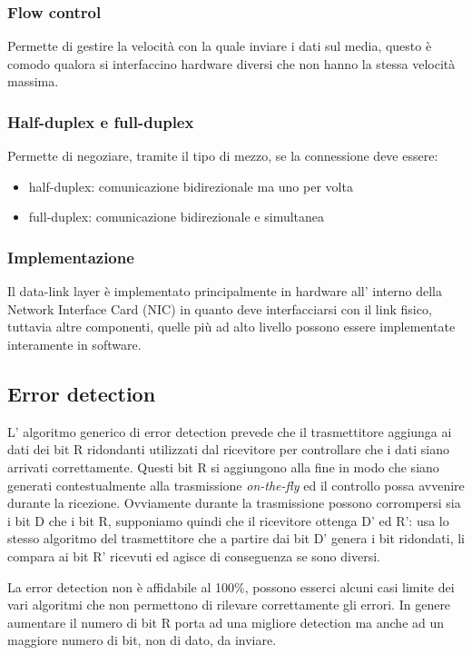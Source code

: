\subsubsection{Flow control}
Permette di gestire la velocità con la quale inviare i dati sul media, questo è comodo qualora si interfaccino hardware diversi che non hanno la stessa velocità massima.

\subsubsection{Half-duplex e full-duplex}
Permette di negoziare, tramite il tipo di mezzo, se la connessione deve essere:
\begin{itemize}
    \item half-duplex: comunicazione bidirezionale ma uno per volta
    \item full-duplex: comunicazione bidirezionale e simultanea
\end{itemize}

\subsubsection{Implementazione}
Il data-link layer è implementato principalmente in hardware all' interno della Network Interface Card (NIC) in quanto deve interfacciarsi con il link fisico, tuttavia altre componenti, quelle più ad alto livello possono essere implementate interamente in software.

\subsection{Error detection}
L' algoritmo generico di error detection prevede che il trasmettitore aggiunga ai dati dei bit R ridondanti utilizzati dal ricevitore per controllare che i dati siano arrivati correttamente.
Questi bit R si aggiungono alla fine in modo che siano generati contestualmente alla trasmissione \emph{on-the-fly} ed il controllo possa avvenire durante la ricezione.
Ovviamente durante la trasmissione possono corrompersi sia i bit D che i bit R, supponiamo quindi che il ricevitore ottenga D' ed R': usa lo stesso algoritmo del trasmettitore che a partire dai bit D' genera i bit ridondati, li compara ai bit R' ricevuti ed agisce di conseguenza se sono diversi.

La error detection non è affidabile al 100\%, possono esserci alcuni casi limite dei vari algoritmi che non permettono di rilevare correttamente gli errori.
In genere aumentare il numero di bit R porta ad una migliore detection ma anche ad un maggiore numero di bit, non di dato, da inviare.

